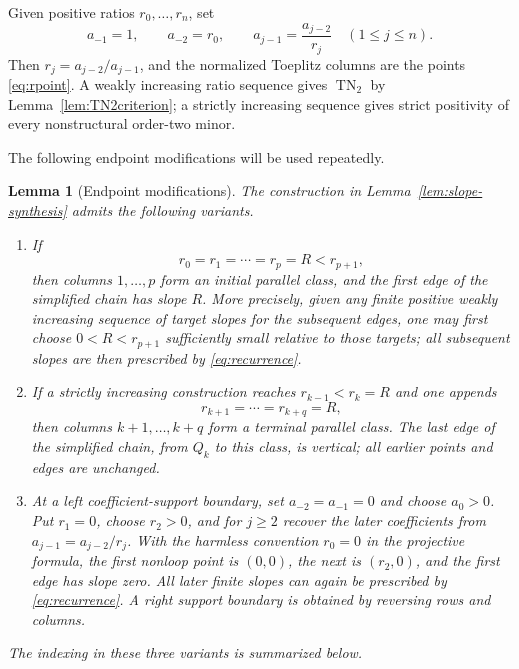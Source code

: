 \documentclass{amsart}
\numberwithin{equation}{section}
\newtheorem{lemma}[theorem]{Lemma}
\theoremstyle{definition}
\theoremstyle{remark}
\DeclareMathOperator{\TN}{TN}
\begin{document}
Given positive ratios $r_0,\ldots,r_n$, set
\begin{equation}\label{eq:recovercoeff}
 a_{-1}=1,
 \qquad
 a_{-2}=r_0,
 \qquad
 a_{j-1}=\frac{a_{j-2}}{r_j}
 \quad(1\le j\le n).
\end{equation}
Then $r_j=a_{j-2}/a_{j-1}$, and the normalized Toeplitz columns are the points \eqref{eq:rpoint}.  A weakly increasing ratio sequence gives $\TN_2$ by Lemma~\ref{lem:TN2criterion}; a strictly increasing sequence gives strict positivity of every nonstructural order-two minor.

The following endpoint modifications will be used repeatedly.

\begin{lemma}[Endpoint modifications]\label{lem:endpoint-modifications}
The construction in Lemma~\ref{lem:slope-synthesis} admits the following variants.
\begin{enumerate}
\item If
\[
 r_0=r_1=\cdots=r_p=R<r_{p+1},
\]
then columns $1,\ldots,p$ form an initial parallel class, and the first edge of the simplified chain has slope $R$.  More precisely, given any finite positive weakly increasing sequence of target slopes for the subsequent edges, one may first choose $0<R<r_{p+1}$ sufficiently small relative to those targets; all subsequent slopes are then prescribed by \eqref{eq:recurrence}.
\item If a strictly increasing construction reaches $r_{k-1}<r_k=R$ and one appends
\[
 r_{k+1}=\cdots=r_{k+q}=R,
\]
then columns $k+1,\ldots,k+q$ form a terminal parallel class.  The last edge of the simplified chain, from $Q_k$ to this class, is vertical; all earlier points and edges are unchanged.
\item At a left coefficient-support boundary, set $a_{-2}=a_{-1}=0$ and choose $a_0>0$.  Put $r_1=0$, choose $r_2>0$, and for $j\ge2$ recover the later coefficients from $a_{j-1}=a_{j-2}/r_j$.  With the harmless convention $r_0=0$ in the projective formula, the first nonloop point is $(0,0)$, the next is $(r_2,0)$, and the first edge has slope zero.  All later finite slopes can again be prescribed by \eqref{eq:recurrence}.  A right support boundary is obtained by reversing rows and columns.
\end{enumerate}
The indexing in these three variants is summarized below.
\begin{center}
\small
\renewcommand{\arraystretch}{1.18}
\begin{tabularx}{\textwidth}{@{}>{\raggedright\arraybackslash}X>{\raggedright\arraybackslash}p{}>{\raggedright\arraybackslash}X@{}}

\end{tabularx}
\end{center}
\end{lemma}
\end{document}
